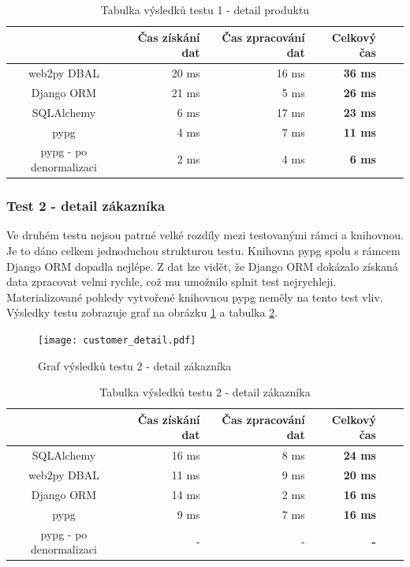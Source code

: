 \documentclass[ing,male,java,dept456]{diploma}						%
\begin{document}
\begin{table}[h!]
  \centering
  \begin{tabular}{|c|r|r|r|r|r|}
    \hline
    & Čas získání dat & Čas zpracování dat & \textbf{Celkový čas} \\
    \hline
    web2py DBAL & 20 ms & 16 ms & \textbf{36 ms} \\
    \hline
    Django ORM & 21 ms & 5 ms & \textbf{26 ms} \\
    \hline
    SQLAlchemy & 6 ms & 17 ms & \textbf{23 ms} \\
    \hline
    pypg & 4 ms & 7 ms & \textbf{11 ms} \\
    \hline
    pypg - po denormalizaci & 2 ms & 4 ms & \textbf{6 ms} \\
    \hline
  \end{tabular}
  \caption{Tabulka výsledků testu 1 - detail produktu}
  \label{tab:TestPD}
\end{table}

\subsubsection{Test 2 - detail zákazníka}
Ve druhém testu nejsou patrné velké rozdíly mezi testovanými rámci a knihovnou. Je to dáno celkem jednoduchou strukturou testu. Knihovna pypg spolu s rámcem Django ORM dopadla nejlépe. Z dat lze vidět, že Django ORM dokázalo získaná data zpracovat velmi rychle, což mu umožnilo splnit test nejrychleji. Materializované pohledy vytvořené knihovnou pypg neměly na tento test vliv. Výsledky testu zobrazuje graf na obrázku \ref{fig:TestCD} a tabulka \ref{tab:TestCD}.

\begin{figure}[h!]
    \centering
    \texttt{[image: customer\_detail.pdf]}
    \caption{Graf výsledků testu 2 - detail zákazníka}
    \label{fig:TestCD}
\end{figure}
\begin{table}[h!]
  \centering
  \begin{tabular}{|c|r|r|r|r|r|}
    \hline
    & Čas získání dat & Čas zpracování dat & \textbf{Celkový čas} \\
    \hline
    SQLAlchemy & 16 ms & 8 ms & \textbf{24 ms} \\
    \hline
    web2py DBAL & 11 ms & 9 ms & \textbf{20 ms} \\
    \hline
    Django ORM & 14 ms & 2 ms & \textbf{16 ms} \\
    \hline
    pypg & 9 ms & 7 ms & \textbf{16 ms} \\
    \hline
    pypg - po denormalizaci & - & - & \textbf{-} \\
    \hline
  \end{tabular}
  \caption{Tabulka výsledků testu 2 - detail zákazníka}
  \label{tab:TestCD}
\end{table}
\end{document}

